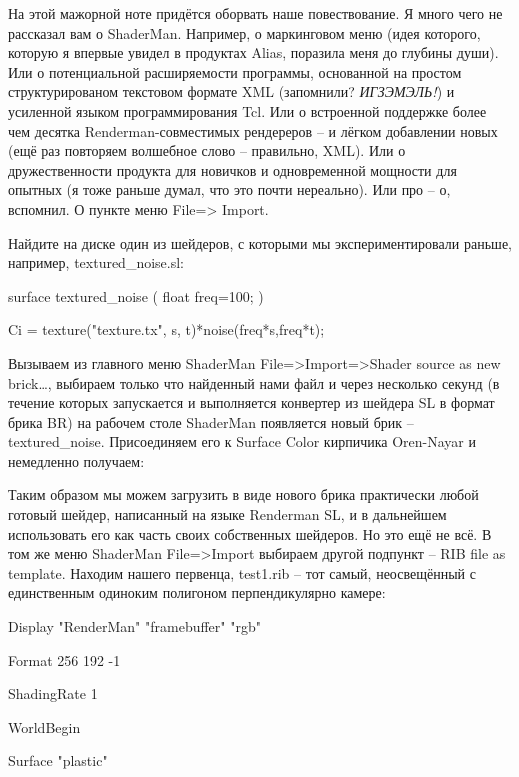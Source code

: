  На этой мажорной ноте придётся оборвать наше
    повествование. Я много чего  не рассказал вам о ShaderMan.
    Например, о маркинговом меню (идея которого, которую я впервые
    увидел в продуктах Alias, поразила меня до глубины души). Или о
    потенциальной расширяемости программы, основанной на простом
    структурированом текстовом формате XML (запомнили? {\it ИГЗЭМЭЛЬ!}) и усиленной языком
    программирования Tcl. Или о встроенной поддержке более чем десятка
    Renderman-совместимых рендереров – и лёгком добавлении новых (ещё
    раз повторяем волшебное слово – правильно, XML). Или о
    дружественности продукта для новичков и одновременной мощности для
    опытных (я тоже раньше думал, что это почти нереально). Или про –
    о, вспомнил. О пункте меню File=> Import.
  

 Найдите на диске один из шейдеров, с которыми мы
    экспериментировали раньше, например, textured\_noise.sl:
  

surface
    textured\_noise ( float freq=100; )
  

{
  

  Ci = texture("texture.tx", s,
    t)*noise(freq*s,freq*t);
  

 }
  

 Вызываем из главного меню ShaderMan
    File=>Import=>Shader source as new brick…, выбираем только
    что найденный нами файл и через несколько секунд (в течение которых
    запускается и выполняется конвертер из шейдера SL в формат брика
    BR) на рабочем столе ShaderMan появляется новый брик –
    textured\_noise. Присоединяем его к Surface Color кирпичика
    Oren-Nayar и немедленно получаем:
  

  

 Таким образом мы можем загрузить в виде нового
    брика практически любой готовый шейдер, написанный на языке
    Renderman SL, и в дальнейшем использовать его как часть своих
    собственных шейдеров. Но это ещё не всё. В том же меню ShaderMan
    File=>Import выбираем другой подпункт – RIB file as template.
    Находим нашего первенца, test1.rib – тот самый, неосвещённый с
    единственным одиноким полигоном перпендикулярно камере:
  

Display
    "RenderMan" "framebuffer" "rgb"
  

Format
    256 192 -1
  

ShadingRate
    1
  

WorldBegin
  

   Surface "plastic"
  

